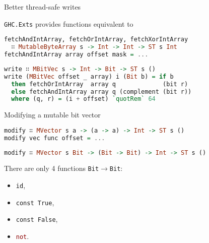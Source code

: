 \documentclass[handout]{beamer}
\begin{document}
\begin{frame}[fragile]{Better thread-safe writes}

{\tt GHC.Exts} provides functions equivalent to

\begin{lstlisting}[language=Haskell]
fetchAndIntArray, fetchOrIntArray, fetchXorIntArray
  ∷ MutableByteArray s -> Int -> Int -> ST s Int
fetchAndIntArray array offset mask = ...
\end{lstlisting}

\pause

\begin{lstlisting}[language=Haskell]
write ∷ MBitVec s -> Int -> Bit -> ST s ()
write (MBitVec offset _ array) i (Bit b) = if b
  then fetchOrIntArray  array q             (bit r)
  else fetchAndIntArray array q (complement (bit r))
  where (q, r) = (i + offset) `quotRem` 64
\end{lstlisting}

\end{frame}

\begin{frame}[fragile]{Modifying a mutable bit vector}

\begin{lstlisting}[language=Haskell]
modify ∷ MVector s a -> (a -> a) -> Int -> ST s ()
modify vec func offset = ...
\end{lstlisting}

\pause

\begin{lstlisting}[language=Haskell]
modify ∷ MVector s Bit -> (Bit -> Bit) -> Int -> ST s ()
\end{lstlisting}

\pause

\bigskip

There are only 4 functions {\tt Bit}${}\to{}${\tt Bit}:
\begin{itemize}[<+->]
\item {\tt id},
\item {\tt const True},
\item {\tt const False},
\item \textcolor{darkred}{\tt not}.
\end{itemize}

\end{frame}
\end{document}
